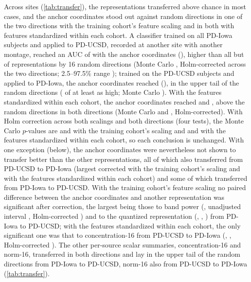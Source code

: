 \documentclass[10pt,letterpaper]{article}
\begin{document}
Across sites (\cref{tab:transfer}), the representations transferred above chance in most cases,
and the anchor coordinates stood out against random directions in one of the two directions with the
training cohort's feature scaling and in both with features standardized within each cohort. A
classifier trained on all PD-Iowa subjects and applied to PD-UCSD, recorded at another site with
another montage, reached an AUC of \TransferIowaToUCSDAnchorAUC{} \TransferIowaToUCSDAnchorCI{} with
the anchor coordinates (\TransferIowaToUCSDAnchorP), higher than all but
\TransferIowaToUCSDRandGeCount{} of \TransferIowaToUCSDRandN{} representations by 16 random directions
(Monte Carlo \TransferIowaToUCSDRandP{}, Holm-corrected across the two directions; 2.5--97.5\% range
\TransferIowaToUCSDRandRange); trained on the \NUCSDPD{} PD-UCSD subjects and applied to PD-Iowa, the
anchor coordinates reached \TransferUCSDToIowaAnchorAUC{} \TransferUCSDToIowaAnchorCI{}
(\TransferUCSDToIowaAnchorP), in the upper tail of the random directions
(\TransferUCSDToIowaRandGeCount{} of \TransferUCSDToIowaRandN{} at least as high; Monte Carlo
\TransferUCSDToIowaRandP). With the features standardized within each cohort, the anchor coordinates
reached \TransferIowaToUCSDHarmAnchorAUC{} and \TransferUCSDToIowaHarmAnchorAUC, above the random
directions in both directions (Monte Carlo \TransferIowaToUCSDHarmRandP{} and
\TransferUCSDToIowaHarmRandP, Holm-corrected). With Holm correction across both scalings and both
directions (four tests), the Monte Carlo $p$-values are \TransferIowaToUCSDRandPHolmFour{} and
\TransferUCSDToIowaRandPHolmFour{} with the training cohort's scaling and
\TransferIowaToUCSDHarmRandPHolmFour{} and \TransferUCSDToIowaHarmRandPHolmFour{} with the features
standardized within each cohort, so each conclusion is unchanged\GuardHolmFour. With one exception (below), the anchor coordinates were
nevertheless not shown to transfer better than the other representations, all of which also
transferred from PD-UCSD to PD-Iowa (largest corrected \TransferUCSDToIowaMaxSecondaryP{} with the
training cohort's scaling and \TransferUCSDToIowaHarmMaxSecondaryP{} with the features standardized
within each cohort) and some of which transferred from PD-Iowa to PD-UCSD.
With the training cohort's feature scaling no paired difference between the anchor coordinates and
another representation was significant after correction, the largest being those to band power
(\TransferIowaToUCSDAnchorMinusBand, unadjusted interval \TransferIowaToUCSDAnchorMinusBandCI,
Holm-corrected \TransferIowaToUCSDAnchorMinusBandP) and to the quantized representation
(\TransferIowaToUCSDAnchorMinusQuant, \TransferIowaToUCSDAnchorMinusQuantCI,
\TransferIowaToUCSDAnchorMinusQuantP) from PD-Iowa to PD-UCSD; with the features standardized within
each cohort, the only significant one was that to concentration-16 from PD-UCSD to PD-Iowa
(\TransferUCSDToIowaHarmAnchorMinusRbar, \TransferUCSDToIowaHarmAnchorMinusRbarCI, Holm-corrected
\TransferUCSDToIowaHarmAnchorMinusRbarP). The other per-source scalar summaries, concentration-16 and
norm-16, transferred in both directions and lay in the upper tail of the random directions from
PD-Iowa to PD-UCSD, norm-16 also from PD-UCSD to PD-Iowa (\cref{tab:transfer}).
\end{document}
